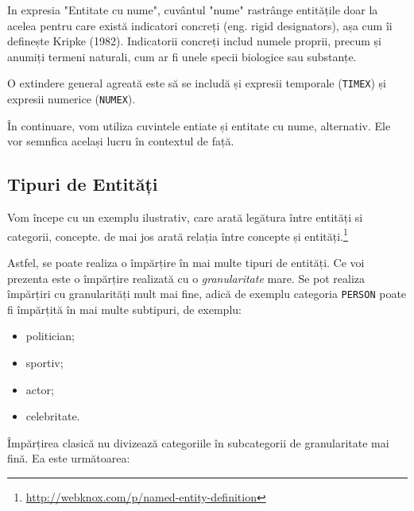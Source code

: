 In expresia "Entitate cu nume", cuvântul "nume" rastrânge entitățile doar la acelea pentru care există indicatori concreți (eng. rigid designators), așa cum îi definește Kripke (1982). Indicatorii concreți includ numele proprii, precum și anumiți termeni naturali, cum ar fi unele specii biologice sau substanțe.

O extindere general agreată este să se includă și expresii temporale (\texttt{TIMEX}) și expresii numerice (\texttt{NUMEX}).

În continuare, vom utiliza cuvintele entiate și entitate cu nume, alternativ. Ele vor semnfica același lucru în contextul de față.

\subsection{Tipuri de Entități}

Vom începe cu un exemplu ilustrativ, care arată legătura între entități si categorii, concepte.  de mai jos arată relația între concepte și entități.\footnote{\url{http://webknox.com/p/named-entity-definition}}



Astfel, se poate realiza o împărțire în mai multe tipuri de entități. Ce voi prezenta este o împărțire realizată cu o \textit{granularitate} mare. Se pot realiza împărțiri cu granularități mult mai fine, adică de exemplu categoria \texttt{PERSON} poate fi împărțită în mai multe subtipuri, de exemplu:

\begin{itemize}
\item politician;
\item sportiv;
\item actor;
\item celebritate.
\end{itemize}

Împărțirea clasică nu divizează categoriile în subcategorii de granularitate mai fină. Ea este următoarea:

